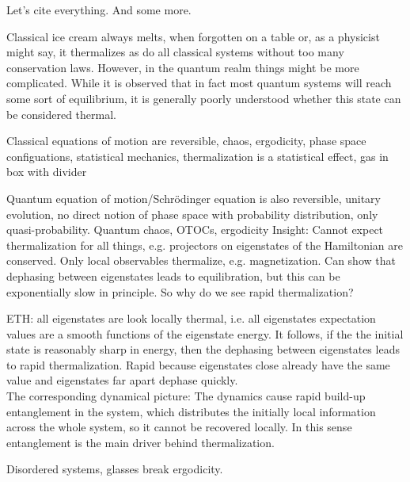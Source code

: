 \label{pt:introduction}
Let's cite everything\cite{braemerPairLocalizationDipolar2022,eulerMetronomeSpinStabilizes2024,franzEmergentPairLocalization2022,franzObservationUniversalRelaxation2023,geierTimereversalDipolarQuantum2024,braemerClusterTruncatedWigner2024}. And some more\cite{luitzHowSmallQuantum2017,nandkishoreManyBodyLocalized2017}.

Classical ice cream always melts, when forgotten on a table or, as a physicist might say, it thermalizes as do all classical systems without too many conservation laws. However, in the quantum realm things might be more complicated. While it is observed that in fact most quantum systems will reach some sort of equilibrium, it is generally poorly understood whether this state can be considered thermal.  

Classical equations of motion are reversible, chaos, ergodicity, phase space configuations, statistical mechanics, thermalization is a statistical effect, gas in box with divider

Quantum equation of motion/Schrödinger equation is also reversible, unitary evolution, no direct notion of phase space with probability distribution, only quasi-probability. 
Quantum chaos, OTOCs, ergodicity
Insight: Cannot expect thermalization for all things, e.g. projectors on eigenstates of the Hamiltonian are conserved. Only local observables thermalize, e.g. magnetization.
Can show that dephasing between eigenstates leads to equilibration, but this can be exponentially slow in principle. So why do we see rapid thermalization?

ETH: all eigenstates are look locally thermal, i.e. all eigenstates expectation values are a smooth functions of the eigenstate energy. It follows, if the the initial state is reasonably sharp in energy, then the dephasing between eigenstates leads to rapid thermalization. Rapid because eigenstates close already have the same value and eigenstates far apart dephase quickly.\\
The corresponding dynamical picture: The dynamics cause rapid build-up entanglement in the system, which distributes the initially local information across the whole system, so it cannot be recovered locally. In this sense entanglement is the main driver behind thermalization.

Disordered systems, glasses break ergodicity.

